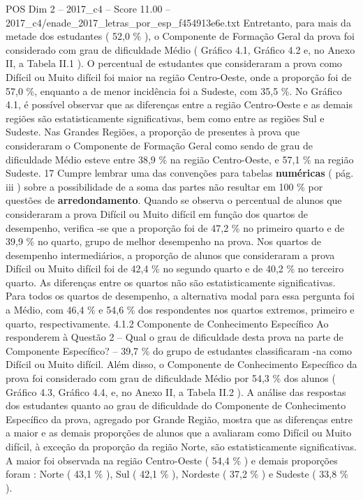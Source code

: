 \begin{textsample}{POS Dim 2 – 2017\_c4 – Score 11.00 – 2017\_c4/enade\_2017\_letras\_por\_esp\_f454913e6e.txt}
Entretanto, para mais da metade dos estudantes ( 52,0 \% ), o Componente de Formação Geral da prova foi considerado com grau de dificuldade Médio ( Gráfico 4.1, Gráfico 4.2 e, no Anexo II, a Tabela II.1 ).
O percentual de estudantes que consideraram a prova como Difícil ou Muito difícil foi maior na região Centro-Oeste, onde a proporção foi de 57,0 \%, enquanto a de menor incidência foi a Sudeste, com 35,5 \%.
No Gráfico 4.1, é possível observar que as diferenças entre a região Centro-Oeste e as demais regiões são estatisticamente significativas, bem como entre as regiões Sul e Sudeste.
Nas Grandes Regiões, a proporção de presentes à prova que consideraram o Componente de Formação Geral como sendo de grau de dificuldade Médio esteve entre 38,9 \% na região Centro-Oeste, e 57,1 \% na região Sudeste. 17 Cumpre lembrar uma das convenções para tabelas \textbf{numéricas} ( pág. iii ) sobre a possibilidade de a soma das partes não resultar em 100 \% por questões de \textbf{arredondamento}.
Quando se observa o percentual de alunos que consideraram a prova Difícil ou Muito difícil em função dos quartos de desempenho, verifica -se que a proporção foi de 47,2 \% no primeiro quarto e de 39,9 \% no quarto, grupo de melhor desempenho na prova.
Nos quartos de desempenho intermediários, a proporção de alunos que consideraram a prova Difícil ou Muito difícil foi de 42,4 \% no segundo quarto e de 40,2 \% no terceiro quarto.
As diferenças entre os quartos não são estatisticamente significativas.
Para todos os quartos de desempenho, a alternativa modal para essa pergunta foi a Médio, com 46,4 \% e 54,6 \% dos respondentes nos quartos extremos, primeiro e quarto, respectivamente. 4.1.2 Componente de Conhecimento Específico Ao responderem à Questão 2 – Qual o grau de dificuldade desta prova na parte de Componente Específico? – 39,7 \% do grupo de estudantes classificaram -na como Difícil ou Muito difícil.
Além disso, o Componente de Conhecimento Específico da prova foi considerado com grau de dificuldade Médio por 54,3 \% dos alunos ( Gráfico 4.3, Gráfico 4.4, e, no Anexo II, a Tabela II.2 ).
A análise das respostas dos estudantes quanto ao grau de dificuldade do Componente de Conhecimento Específico da prova, agregado por Grande Região, mostra que as diferenças entre a maior e as demais proporções de alunos que a avaliaram como Difícil ou Muito difícil, à exceção da proporção da região Norte, são estatisticamente significativas.
A maior foi observada na região Centro-Oeste ( 54,4 \% ) e demais proporções foram : Norte ( 43,1 \% ), Sul ( 42,1 \% ), Nordeste ( 37,2 \% ) e Sudeste ( 33,8 \% ).

\end{textsample}
